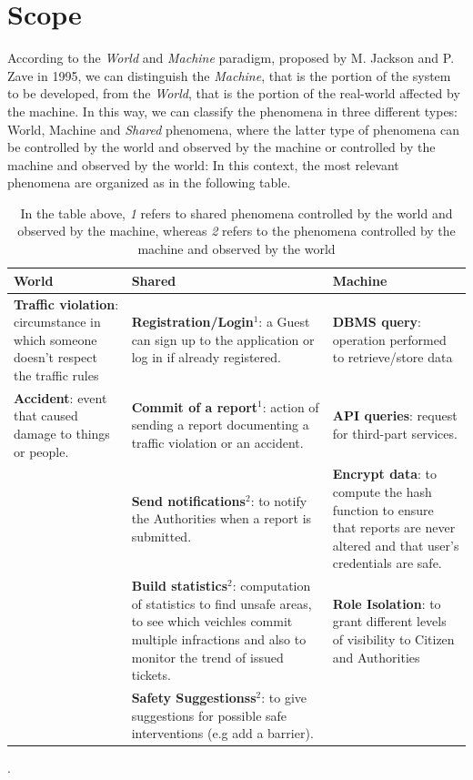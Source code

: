 \documentclass{report}
\begin{document}
\section{Scope}
According to the \textit{World} and \textit{Machine} paradigm, proposed by M. Jackson and P. Zave in 1995, we can distinguish the \textit{Machine}, that is the portion of the system to be developed, from the \textit{World}, that is the portion of the real-world affected by the machine. In this way, we can classify the phenomena in three different types: World, Machine and \textit{Shared} phenomena, where the latter type of phenomena can be controlled by the world and observed by the machine or controlled by the machine and observed by the world:
\newline
In this context, the most relevant phenomena are organized as in the following table.

\begin{table}[p]
		\begin{center}
		\begin{tabular}{|C{.28\textwidth}||C{.28\textwidth}||C{.28\textwidth}|}
			\toprule
			\textbf{World} &\textbf{Shared}& \textbf{Machine}\\
			\midrule
			\midrule
			\textbf{Traffic violation}: circumstance in which someone doesn't respect the traffic rules &\textbf{\small{Registration/Login}}$^{1}$: a Guest can sign up to the application or log in if already registered.&\textbf{DBMS query}: operation performed to retrieve/store data\\
			\midrule
			\textbf{Accident}: event that caused damage to things or people.&\textbf{Commit of a report}$^{1}$: action of sending a report documenting a traffic violation or an accident.&\textbf{API queries}: request for third-part services.\\
			\midrule
			&\textbf{Send notifications}$^{2}$: to notify the Authorities when a report is submitted.&\textbf{Encrypt data}: to compute the hash function to ensure that reports are never altered and that user's credentials are safe.\\
			\midrule
			&\textbf{Build statistics}$^{2}$: computation of statistics to find unsafe areas, to see which veichles commit multiple infractions and also to monitor the trend of issued tickets.&\textbf{Role Isolation}: to grant different levels of visibility to Citizen and Authorities\\ 
			\midrule			
			&\textbf{Safety Suggestionss}$^{2}$: to give suggestions for possible safe interventions (e.g add a barrier).&\\
			\bottomrule
		\end{tabular}
		\end{center}
		\caption{In the table above, \textit{1} refers to shared phenomena controlled by the world and observed by the machine, whereas \textit{2} refers to the phenomena controlled by the machine and observed by the world}.
		\label{tab:multicol}
	\end{table}
\clearpage
\end{document}

